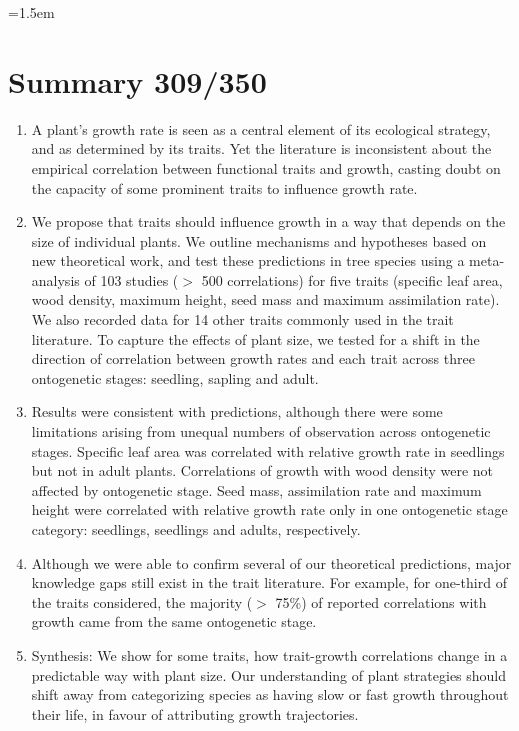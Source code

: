 \documentclass[a4paper,11pt]{article}
\date{}
\begin{document}
\mstitlepage
\noindent
\parindent=1.5em
\addtolength{\parskip}{.3em}
\doublespacing
\linenumbers
\section{Summary 309/350}\label{abstract}
\begin{enumerate}
\def\labelenumi{\arabic{enumi}.}
\itemsep1pt\parskip0pt
\item A plant's growth rate is seen as a central element of its ecological strategy, and as determined by its traits. Yet the literature is inconsistent about the empirical correlation between functional traits and growth, casting doubt on the capacity of some prominent traits to influence growth rate.

\item We propose that traits should influence growth in a way that depends on the size of individual plants. We outline mechanisms and hypotheses based on new theoretical work, and test these predictions in tree species using a meta-analysis of 103 studies ($>$ 500 correlations) for five traits (specific leaf area, wood density, maximum height, seed mass and maximum assimilation rate). We also recorded data for 14 other traits commonly used in the trait literature. To capture the effects of plant size, we tested for a shift in the direction of correlation between growth rates and each trait across three ontogenetic stages: seedling, sapling and adult.

\item Results were consistent with predictions, although there were some limitations arising from unequal numbers of observation across ontogenetic stages. Specific leaf area was correlated with relative growth rate in seedlings but not in adult plants. Correlations of growth with wood density were not affected by ontogenetic stage. Seed mass, assimilation rate and maximum height were correlated with relative growth rate only in one ontogenetic stage category: seedlings, seedlings and adults, respectively.

\item Although we were able to confirm several of our theoretical predictions, major knowledge gaps still exist in the trait literature. For example, for one-third of the traits considered, the majority ($>$ 75\%) of reported correlations with growth came from the same ontogenetic stage.

\item Synthesis: We show for some traits, how trait-growth correlations change in a predictable way with plant size. Our understanding of plant strategies should shift away from categorizing species as having slow or fast growth throughout their life, in favour of attributing growth trajectories.
\end{enumerate}
\end{document}
